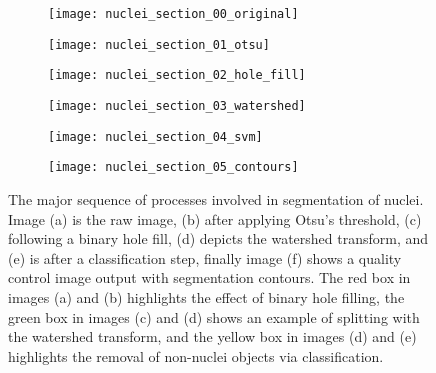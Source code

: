\begin{figure}[htbp]\centering
	\begin{subfigure}[b]{0.25\linewidth} %
		\centering
		\texttt{[image: nuclei\_section\_00\_original]}
		\caption{}
		\label{figure:image_processing:nuclei_segmentation:00}
		\vspace{1ex}
	\end{subfigure}
	\begin{subfigure}[b]{0.25\linewidth} %
		\centering
		\texttt{[image: nuclei\_section\_01\_otsu]}
		\caption{}
		\label{figure:image_processing:nuclei_segmentation:01}
		\vspace{1ex}
	\end{subfigure}
	\begin{subfigure}[b]{0.25\linewidth} %
		\centering
		\texttt{[image: nuclei\_section\_02\_hole\_fill]}
		\caption{}
		\label{figure:image_processing:nuclei_segmentation:02}
		\vspace{1ex}
	\end{subfigure}
	\begin{subfigure}[b]{0.25\linewidth} %
		\centering
		\texttt{[image: nuclei\_section\_03\_watershed]}
		\caption{}
		\label{figure:image_processing:nuclei_segmentation:03}
		\vspace{1ex}
	\end{subfigure}
	\begin{subfigure}[b]{0.25\linewidth} %
		\centering
		\texttt{[image: nuclei\_section\_04\_svm]}
		\caption{}
		\label{figure:image_processing:nuclei_segmentation:04}
		\vspace{1ex}
	\end{subfigure}
	\begin{subfigure}[b]{0.25\linewidth} %
		\centering
		\texttt{[image: nuclei\_section\_05\_contours]}
		\caption{}
		\label{figure:image_processing:nuclei_segmentation:05}
		\vspace{1ex}
	\end{subfigure}
\caption[Nuclei segmentation]{The major sequence of processes involved in segmentation of nuclei. Image (a) is the raw image, (b) after applying Otsu's threshold, (c) following a binary hole fill, (d) depicts the watershed transform, and (e) is after a classification step, finally image (f) shows a quality control image output with segmentation contours. The red box in images (a) and (b) highlights the effect of binary hole filling, the green box in images (c) and (d) shows an example of splitting with the watershed transform, and the yellow box in images (d) and (e) highlights the removal of non-nuclei objects via classification.}
\label{figure:image_processing:nuclei_segmentation}
\end{figure}

